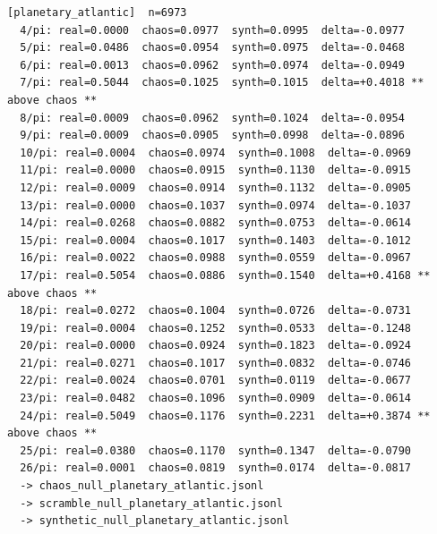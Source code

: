 \documentclass[11pt, letterpaper, openany]{book}
\begin{document}
\begin{empiricalbox}
\begin{lstlisting}[style=terminal]
[planetary_atlantic]  n=6973
  4/pi: real=0.0000  chaos=0.0977  synth=0.0995  delta=-0.0977
  5/pi: real=0.0486  chaos=0.0954  synth=0.0975  delta=-0.0468
  6/pi: real=0.0013  chaos=0.0962  synth=0.0974  delta=-0.0949
  7/pi: real=0.5044  chaos=0.1025  synth=0.1015  delta=+0.4018 ** above chaos **
  8/pi: real=0.0009  chaos=0.0962  synth=0.1024  delta=-0.0954
  9/pi: real=0.0009  chaos=0.0905  synth=0.0998  delta=-0.0896
  10/pi: real=0.0004  chaos=0.0974  synth=0.1008  delta=-0.0969
  11/pi: real=0.0000  chaos=0.0915  synth=0.1130  delta=-0.0915
  12/pi: real=0.0009  chaos=0.0914  synth=0.1132  delta=-0.0905
  13/pi: real=0.0000  chaos=0.1037  synth=0.0974  delta=-0.1037
  14/pi: real=0.0268  chaos=0.0882  synth=0.0753  delta=-0.0614
  15/pi: real=0.0004  chaos=0.1017  synth=0.1403  delta=-0.1012
  16/pi: real=0.0022  chaos=0.0988  synth=0.0559  delta=-0.0967
  17/pi: real=0.5054  chaos=0.0886  synth=0.1540  delta=+0.4168 ** above chaos **
  18/pi: real=0.0272  chaos=0.1004  synth=0.0726  delta=-0.0731
  19/pi: real=0.0004  chaos=0.1252  synth=0.0533  delta=-0.1248
  20/pi: real=0.0000  chaos=0.0924  synth=0.1823  delta=-0.0924
  21/pi: real=0.0271  chaos=0.1017  synth=0.0832  delta=-0.0746
  22/pi: real=0.0024  chaos=0.0701  synth=0.0119  delta=-0.0677
  23/pi: real=0.0482  chaos=0.1096  synth=0.0909  delta=-0.0614
  24/pi: real=0.5049  chaos=0.1176  synth=0.2231  delta=+0.3874 ** above chaos **
  25/pi: real=0.0380  chaos=0.1170  synth=0.1347  delta=-0.0790
  26/pi: real=0.0001  chaos=0.0819  synth=0.0174  delta=-0.0817
  -> chaos_null_planetary_atlantic.jsonl
  -> scramble_null_planetary_atlantic.jsonl
  -> synthetic_null_planetary_atlantic.jsonl


\end{lstlisting}
\end{empiricalbox}
\end{document}
